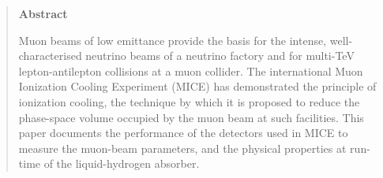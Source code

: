 \begin{quotation}
\begin{center}
\textbf{Abstract}
\end{center}

\noindent
Muon beams of low emittance provide the basis for the intense,
well-characterised neutrino beams of a neutrino factory and for
multi-TeV lepton-antilepton collisions at a muon collider.
The international Muon Ionization Cooling Experiment (MICE) has
demonstrated the principle of ionization cooling, the technique by
which it is proposed to reduce the phase-space volume occupied by the
muon beam at such facilities. 
This paper documents the performance of the detectors used in MICE
to measure the muon-beam parameters, and the physical properties at run-time of the liquid-hydrogen absorber.

\end{quotation}
